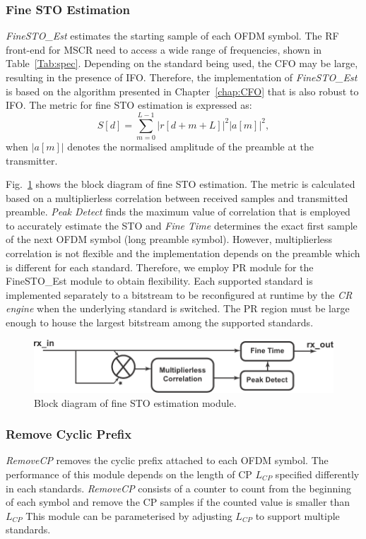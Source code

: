 \subsubsection{Fine STO Estimation}
\emph{FineSTO\_Est} estimates the starting sample of each OFDM symbol.
The RF front-end for MSCR need to access a wide range of frequencies, shown in Table~\ref{Tab:spec}. Depending on the standard being used, the CFO may be large, resulting in the presence of IFO.
Therefore, the implementation of \emph{FineSTO\_Est} is based on the algorithm presented in Chapter~\ref{chap:CFO} that is also robust to IFO.
The metric for fine STO estimation is expressed as:
\begin{equation}
\label{ProposedR}
S[d] =\sum_{m =0}^{L-1}   |r[d+m+L]|^2  |a[m]|^2,
\end{equation}
when $|a[m]|$ denotes the normalised amplitude of the preamble at the transmitter.

Fig.~\ref{fig:STO} shows the block diagram of fine STO estimation.
The metric is calculated based on a multiplierless correlation between received samples and transmitted preamble.
\emph{Peak Detect} finds the maximum value of correlation that is employed to accurately estimate the STO and \emph{Fine Time} determines the exact first sample of the next OFDM symbol (long preamble symbol).
However, multiplierless correlation is not flexible and the implementation depends on the preamble which is different for each standard.
Therefore, we employ PR module for the {FineSTO\_Est} module to obtain flexibility.
Each supported standard is implemented separately to a bitstream to be reconfigured at runtime by the \emph{CR engine} when the underlying standard is switched.
The PR region must be large enough to house the largest bitstream among the supported standards.
\begin{figure}
\centering
\includegraphics [width=0.6\columnwidth]{Figures/MSCR_RX_STO.pdf}
\caption{Block diagram of fine STO estimation module.}
\label{fig:STO}
\end{figure}

\subsubsection{Remove Cyclic Prefix}
\emph{RemoveCP} removes the cyclic prefix attached to each OFDM symbol.
The performance of this module depends on the length of CP $L_{CP}$ specified differently in each standards.
\emph{RemoveCP} consists of a counter to count from the beginning of each symbol and remove the CP samples if the counted value is smaller than $L_{CP}$
This module can be parameterised by adjusting $L_{CP}$ to support multiple standards.

